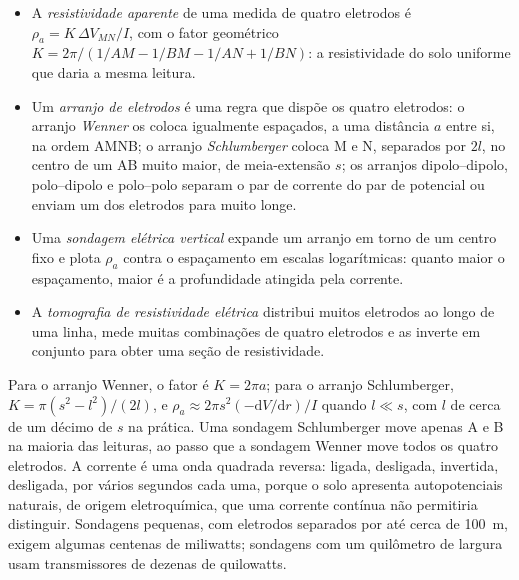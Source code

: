 \begin{definition}\label{def:b3:field-lab-methods-3:resistivity}
\leavevmode
\begin{itemize}
  \item A \emph{resistividade aparente} de uma
        medida de quatro eletrodos é $\rho_a = K\,\Delta V_{MN}/I$, com
        o fator geométrico $K = 2\pi/(1/AM - 1/BM - 1/AN + 1/BN)$: a
        resistividade do solo uniforme que daria a mesma
        leitura.
  \item Um \emph{arranjo de eletrodos} é uma regra que
        dispõe os quatro eletrodos: o arranjo \emph{Wenner} os coloca
        igualmente espaçados, a uma distância $a$ entre si, na ordem AMNB; o
        arranjo \emph{Schlumberger} coloca M e N, separados por $2l$, no
        centro de um AB muito maior, de meia-extensão $s$; os arranjos dipolo--dipolo,
        polo--dipolo e polo--polo separam o par de corrente
        do par de potencial ou enviam um dos eletrodos para muito longe.
  \item Uma \emph{sondagem elétrica vertical}
        expande um arranjo em torno de um centro fixo e plota
        $\rho_a$ contra o espaçamento em escalas logarítmicas: quanto maior
        o espaçamento, maior é a profundidade atingida pela corrente.
  \item A \emph{tomografia de resistividade elétrica}
        distribui muitos eletrodos ao longo de uma linha,
        mede muitas combinações de quatro eletrodos e as inverte
        em conjunto para obter uma seção de resistividade.
\end{itemize}
\end{definition}

Para o arranjo Wenner, o fator é $K = 2\pi a$; para o arranjo Schlumberger,
$K = \pi(s^2 - l^2)/(2l)$, e $\rho_a \approx 2\pi s^2(-\mathrm{d}V/
\mathrm{d}r)/I$ quando $l \ll s$, com $l$ de cerca de um décimo de $s$ na
prática. Uma sondagem Schlumberger move apenas A e B na maioria das leituras,
ao passo que a sondagem Wenner move todos os quatro eletrodos. A corrente é
uma onda quadrada reversa: ligada, desligada, invertida, desligada, por vários segundos cada uma, porque
o solo apresenta autopotenciais naturais, de origem eletroquímica,
que uma corrente contínua não permitiria distinguir. Sondagens pequenas, com
eletrodos separados por até cerca de \qty{100}{m}, exigem algumas centenas de
miliwatts; sondagens com um quilômetro de largura usam transmissores de dezenas de
quilowatts.

